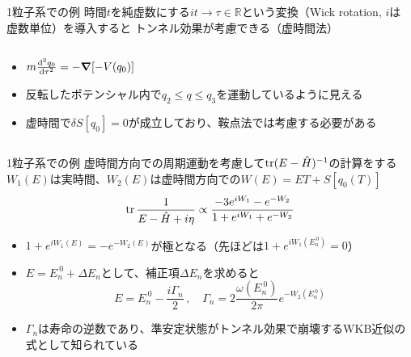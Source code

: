 \documentclass[14pt,aspectratio=169,xcolor=dvipsnames,table,dvipdfmx]{beamer}
\theoremstyle{definition}
\begin{document}
\begin{frame}{1粒子系での例}
  時間$t$を純虚数にする$it\to\tau\in \mathbb{R}$という変換（Wick rotation, $i$は\\虚数単位）を導入すると
  トンネル効果が考慮できる（虚時間法）
  \begin{columns}[t]
    \begin{column}{.5\textwidth}
      \begin{itemize}
        \item $m\dv[2]{q_0}{\tau} = -\grad \qty[-V(q_0)]$
        \item 反転したポテンシャル内で$q_2\leq q\leq q_3$を運動しているように見える
        \item 虚時間で$\delta S[q_0]=0$が成立しており、鞍点法では考慮する必要がある
      \end{itemize}
    \end{column}
    \begin{column}{.5\textwidth}
    \end{column}
  \end{columns}
\end{frame}

\begin{frame}{1粒子系での例}
  虚時間方向での周期運動を考慮して$\trace(E-\hat{H})^{-1}$の計算をする\\
  $W_1(E)$は実時間、$W_2(E)$は虚時間方向での$W(E)=ET+S[q_0(T)]$\\
  \begin{equation*}
    \trace\frac{1}{E-\hat{H}+i\eta} \propto \frac{-3e^{iW_1}-e^{-W_2}}{1+e^{iW_1}+e^{-W_2}}
  \end{equation*}
  \begin{itemize}
    \item $1+e^{iW_1(E)}=-e^{-W_2(E)}$が極となる（先ほどは$1+e^{iW_1(E_n^{~0})}=0$）
    \item $E=E_{n}^{~0}+\varDelta E_n$として、補正項$\varDelta E_n$を求めると
          \begin{equation*}
            E = E_{n}^{~0} -\frac{i\Gamma_n}{2}\,,\quad \Gamma_n = 2\frac{\omega(E_n^{~0})}{2\pi}e^{-W_2(E_n^{~0})}
          \end{equation*}
    \item $\Gamma_n$は寿命の逆数であり、準安定状態がトンネル効果で崩壊するWKB近似の式として知られている
  \end{itemize}
\end{frame}
\end{document}

